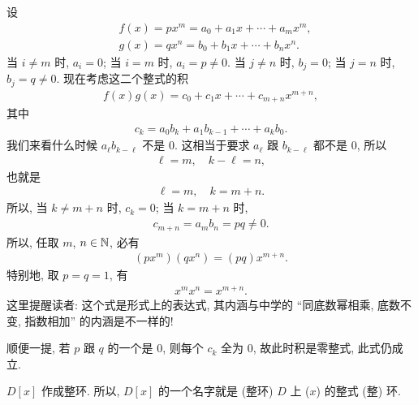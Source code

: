 \begin{remark}
    设
    \begin{align*}
         & f(x) = px^m = a_0 + a_1 x + \cdots + a_m x^m, \\
         & g(x) = qx^n = b_0 + b_1 x + \cdots + b_n x^n.
    \end{align*}
    当 $i \neq m$ 时, $a_i = 0$; 当 $i=m$ 时, $a_i = p \neq 0$. 当 $j \neq n$ 时, $b_j = 0$; 当 $j=n$ 时, $b_j = q \neq 0$. 现在考虑这二个整式的积
    \begin{align*}
        f(x)g(x) = c_0 + c_1 x + \cdots + c_{m+n} x^{m+n},
    \end{align*}
    其中
    \begin{align*}
        c_k = a_0 b_k + a_1 b_{k-1} + \cdots + a_k b_0.
    \end{align*}
    我们来看什么时候 $a_\ell b_{k - \ell}$ 不是 $0$. 这相当于要求 $a_\ell$ 跟 $b_{k - \ell}$ 都不是 $0$, 所以
    \begin{align*}
        \ell = m, \quad k - \ell = n,
    \end{align*}
    也就是
    \begin{align*}
        \ell = m, \quad k = m + n.
    \end{align*}
    所以, 当 $k \neq m+n$ 时, $c_k = 0$; 当 $k = m+n$ 时,
    \begin{align*}
        c_{m+n} = a_m b_n = pq \neq 0.
    \end{align*}
    所以, 任取 $m$, $n \in \mathbb{N}$, 必有
    \begin{align*}
        (px^m) (qx^n) = (pq) x^{m+n}.
    \end{align*}
    特别地, 取 $p=q=1$, 有
    \begin{align*}
        x^m x^n = x^{m+n}.
    \end{align*}
    这里提醒读者: 这个式是形式上的表达式, 其内涵与中学的 ``同底数幂相乘, 底数不变, 指数相加'' 的内涵是不一样的!

    顺便一提, 若 $p$ 跟 $q$ 的一个是 $0$, 则每个 $c_k$ 全为 $0$, 故此时积是零整式, 此式仍成立.
\end{remark}

\begin{proposition}
    $D[x]$ 作成整环. 所以, $D[x]$ 的一个名字就是 (整环) $D$ 上 ($x$) 的整式 (整) 环.
\end{proposition}

